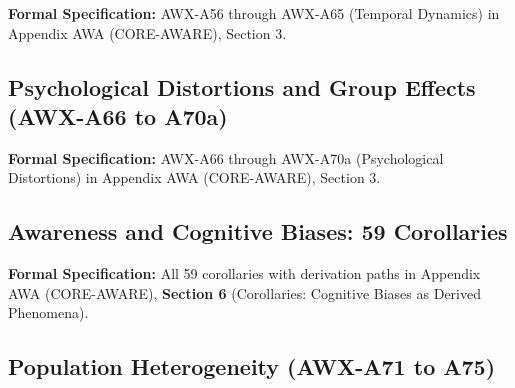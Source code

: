 \begin{cross-reference}
\textbf{Formal Specification:} AWX-A56 through AWX-A65 (Temporal Dynamics) in
Appendix AWA (CORE-AWARE), Section 3.
\end{cross-reference}

\subsection{Psychological Distortions and Group Effects (AWX-A66 to A70a)}
\label{subsec:11-11-distortions}



\begin{cross-reference}
\textbf{Formal Specification:} AWX-A66 through AWX-A70a (Psychological Distortions) in
Appendix AWA (CORE-AWARE), Section 3.
\end{cross-reference}

\subsection{Awareness and Cognitive Biases: 59 Corollaries}
\label{subsec:11-12-biases}



\begin{cross-reference}
\textbf{Formal Specification:} All 59 corollaries with derivation paths in
Appendix AWA (CORE-AWARE), \textbf{Section 6} (Corollaries: Cognitive Biases as Derived Phenomena).
\end{cross-reference}

\subsection{Population Heterogeneity (AWX-A71 to A75)}
\label{subsec:11-13-heterogeneity}



